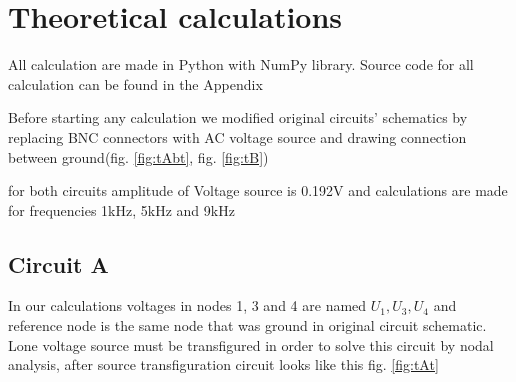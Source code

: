 \documentclass[notitlepage, a4paper, 11pt]{article}
\begin{document}
	\section{Theoretical calculations}
	All calculation are made in Python with NumPy library. Source code for all calculation can be found in the Appendix
	
	Before starting any calculation we modified original circuits' schematics by replacing BNC connectors with AC voltage source and drawing connection between ground(fig. \ref{fig:tAbt}, fig. \ref{fig:tB})
	
	for both circuits amplitude of Voltage source is 0.192V and calculations are made for frequencies 1kHz, 5kHz and 9kHz 
	\subsection{Circuit A}
	In our calculations voltages in nodes 1, 3 and 4 are named $U_1, U_3, U_4$ and reference node is the same node that was ground in original circuit schematic. Lone voltage source must be transfigured in order to solve this circuit by nodal analysis, after source transfiguration circuit looks like this fig. \ref{fig:tAt}
	
\end{document}
